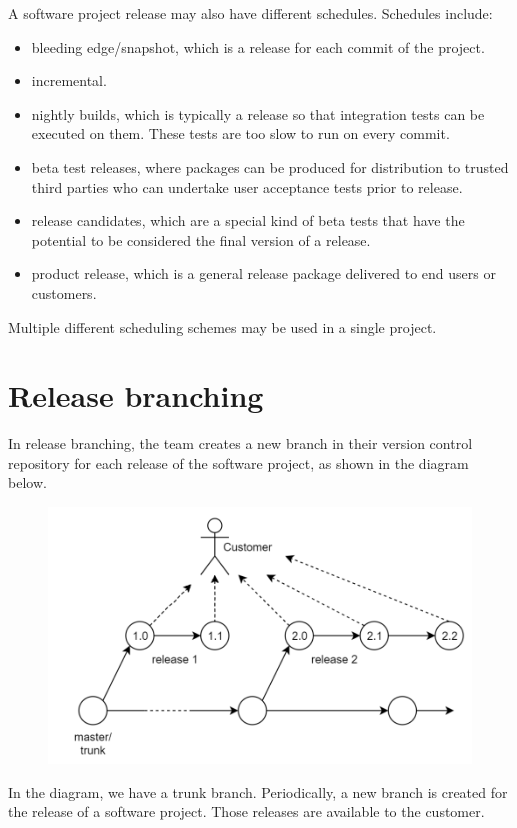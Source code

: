 \documentclass[a4paper, openany]{memoir}
\begin{document}
A software project release may also have different schedules. Schedules include:
\begin{itemize}
    \item bleeding edge/snapshot, which is a release for each commit of the project.
    \item incremental.
    \item nightly builds, which is typically a release so that integration tests can be executed on them. These tests are too slow to run on every commit.
    \item beta test releases, where packages can be produced for distribution to trusted third parties who can undertake user acceptance tests prior to release.
    \item release candidates, which are a special kind of beta tests that have the potential to be considered the final version of a release.
    \item product release, which is a general release package delivered to end users or customers.
\end{itemize}
Multiple different scheduling schemes may be used in a single project.

\section{Release branching}
In release branching, the team creates a new branch in their version control repository for each release of the software project, as shown in the diagram below.
\begin{figure}[H]
    \centering
    \includegraphics[scale=0.45]{src/8.4 Release Branches.PNG}
\end{figure}
\noindent In the diagram, we have a trunk branch. Periodically, a new branch is created for the release of a software project. Those releases are available to the customer. 
\end{document}
